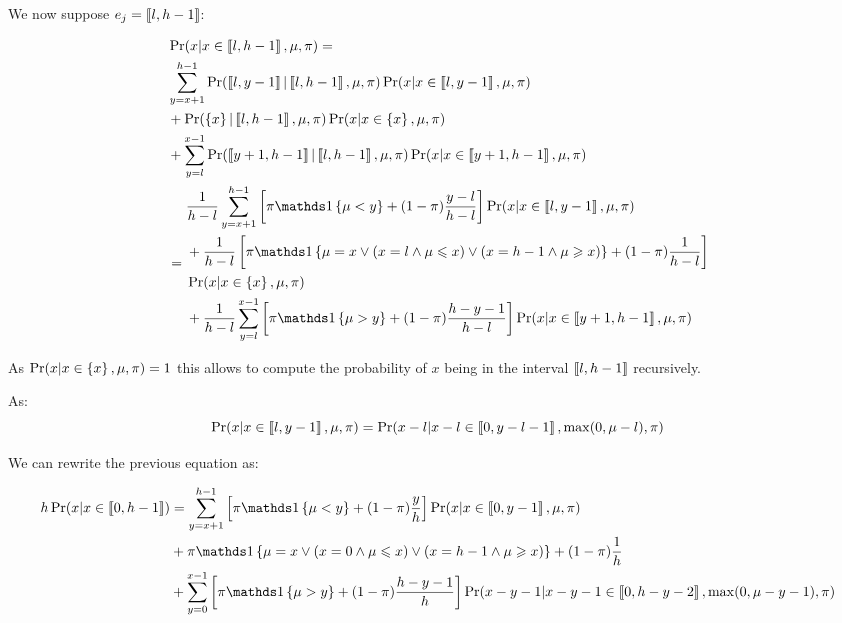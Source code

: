 We now suppose $e_j = \left\llbracket l, h - 1\right\rrbracket$:

\begin{align}
    &\Pr(x | x \in \bbrack{l, h-1}, \mu, \pi) =\\
    &\begin{aligned}
        &\sum_{y=x + 1}^{h-1} \Pr(\bbrack{l, y - 1} | \bbrack{l, h-1}, \mu, \pi) \Pr(x | x \in \bbrack{l, y - 1}, \mu, \pi) \\
        &+ \Pr(\set{x} | \bbrack{l, h-1}, \mu, \pi) \Pr(x | x \in \set{x}, \mu, \pi) \\
        &+ \sum_{y=l}^{x - 1} \Pr(\bbrack{y + 1, h-1} | \bbrack{l, h-1}, \mu, \pi) \Pr(x | x \in \bbrack{y + 1, h-1}, \mu, \pi)
    \end{aligned} \\
    &= \begin{aligned}
        &\frac{1}{h - l} \sum_{y=x + 1}^{h-1} \left[ \pi \indickronecker{\mu < y} + (1-\pi) \frac{y - l}{h - l} \right] \Pr(x | x \in \bbrack{l, y - 1}, \mu, \pi) \\
        &+\frac{1}{h - l} \left[ \pi \indickronecker{\mu = x \lor (x = l \land \mu \leq x) \lor (x = h - 1 \land \mu \geq x)} + (1 - \pi) \frac{1}{h-l} \right] \\
        &\Pr(x | x \in \set{x}, \mu, \pi) \\
        &+\frac{1}{h - l} \sum_{y=l}^{x - 1} \left[ \pi \indickronecker{\mu > y} + (1-\pi) \frac{h - y - 1}{h - l} \right] \Pr(x | x \in \bbrack{y + 1, h-1}, \mu, \pi)
    \end{aligned}
\end{align}

As $\Pr(x | x \in \left\{ x \right\}, \mu, \pi) = 1$ this allows to compute the probability of $x$ being in the interval $\left\llbracket l, h-1\right\rrbracket$ recursively.

As:
\begin{equation}
    \Pr(x | x \in \left\llbracket l, y - 1\right\rrbracket, \mu, \pi) = \Pr(x - l | x - l \in \left\llbracket0, y - l - 1\right\rrbracket, \max(0, \mu - l), \pi)
\end{equation}

We can rewrite the previous equation as:

\begin{align}
    h\Pr(x | x \in \bbrack{0, h - 1})
    &= \sum_{y = x + 1}^{h - 1} \left[ \pi \indickronecker{\mu < y} + (1-\pi) \frac{y}{h} \right] \Pr(x | x \in \bbrack{0, y - 1}, \mu, \pi) \\
    &+ \pi \indickronecker{\mu = x \lor (x = 0 \land \mu \leq x) \lor (x = h - 1 \land \mu \geq x)} + (1 - \pi) \frac{1}{h} \\
    &+ \sum_{y = 0}^{x - 1} \left[ \pi \indickronecker{\mu > y} + (1-\pi) \frac{h - y - 1}{h} \right] \Pr(x - y - 1 | x - y - 1 \in \bbrack{0, h - y - 2}, \max(0, \mu - y - 1), \pi)
\end{align}


